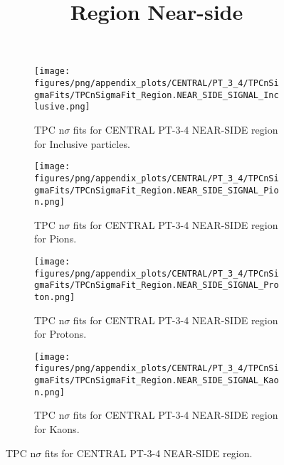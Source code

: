             \begin{figure}[H]
                \title{Region Near-side}
                \begin{subfigure}[b]{0.5\textwidth}
                    \centering
                    \texttt{[image: figures/png/appendix\_plots/CENTRAL/PT\_3\_4/TPCnSigmaFits/TPCnSigmaFit\_Region.NEAR\_SIDE\_SIGNAL\_Inclusive.png]}
                    \caption{TPC n$\sigma$ fits for CENTRAL PT-3-4 NEAR-SIDE region for Inclusive particles.}
                    \label{fig:appendix_CENTRAL_PT-3-4_NEAR_SIDE_SIGNAL_Inclusive}
                \end{subfigure}
                \begin{subfigure}[b]{0.5\textwidth}
                    \centering
                    \texttt{[image: figures/png/appendix\_plots/CENTRAL/PT\_3\_4/TPCnSigmaFits/TPCnSigmaFit\_Region.NEAR\_SIDE\_SIGNAL\_Pion.png]}
                    \caption{TPC n$\sigma$ fits for CENTRAL PT-3-4 NEAR-SIDE region for Pions.}
                    \label{fig:appendix_CENTRAL_PT-3-4_NEAR_SIDE_SIGNAL_Pion}
                \end{subfigure}
                \begin{subfigure}[b]{0.5\textwidth}
                    \centering
                    \texttt{[image: figures/png/appendix\_plots/CENTRAL/PT\_3\_4/TPCnSigmaFits/TPCnSigmaFit\_Region.NEAR\_SIDE\_SIGNAL\_Proton.png]}
                    \caption{TPC n$\sigma$ fits for CENTRAL PT-3-4 NEAR-SIDE region for Protons.}
                    \label{fig:appendix_CENTRAL_PT-3-4_NEAR_SIDE_SIGNAL_Proton}
                \end{subfigure}
                \begin{subfigure}[b]{0.5\textwidth}
                    \centering
                    \texttt{[image: figures/png/appendix\_plots/CENTRAL/PT\_3\_4/TPCnSigmaFits/TPCnSigmaFit\_Region.NEAR\_SIDE\_SIGNAL\_Kaon.png]}
                    \caption{TPC n$\sigma$ fits for CENTRAL PT-3-4 NEAR-SIDE region for Kaons.}
                    \label{fig:appendix_CENTRAL_PT-3-4_NEAR_SIDE_SIGNAL_Kaon}
                \end{subfigure}
                \caption{TPC n$\sigma$ fits for CENTRAL PT-3-4 NEAR-SIDE region.}
                \label{fig:appendix_CENTRAL_PT-3-4_NEAR_SIDE_SIGNAL}
            \end{figure}
